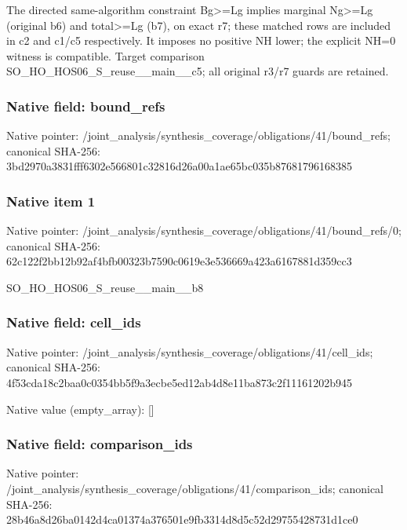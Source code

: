 \documentclass[10pt,a4paper]{article}
\begin{document}
\begingroup\raggedright\sloppy The directed same-algorithm constraint Bg>=\allowbreak{}Lg implies marginal Ng>=\allowbreak{}Lg (original b6) and total>=\allowbreak{}Lg (b7),\allowbreak{} on exact r7;\allowbreak{} these matched rows are included in c2 and c1/\allowbreak{}c5 respectively. It imposes no positive NH lower;\allowbreak{} the explicit NH=\allowbreak{}0 witness is compatible. Target comparison SO\_\allowbreak{}HO\_\allowbreak{}HOS06\_\allowbreak{}S\_\allowbreak{}reuse\_\allowbreak{}\_\allowbreak{}main\_\allowbreak{}\_\allowbreak{}c5;\allowbreak{} all original r3/\allowbreak{}r7 guards are retained.\par\endgroup

\subsubsection{Native field: bound\_\allowbreak{}refs}
Native pointer: /joint\_\allowbreak{}analysis/synthesis\_\allowbreak{}coverage/obligations/41/bound\_\allowbreak{}refs; canonical SHA-256: 3bd2970a3831fff6302e566801c32816d26a00a1ae65bc035b87681796168385

\subsubsection{Native item 1}
Native pointer: /joint\_\allowbreak{}analysis/synthesis\_\allowbreak{}coverage/obligations/41/bound\_\allowbreak{}refs/0; canonical SHA-256: 62c122f2bb12b92af4bfb00323b7590c0619e3e536669a423a6167881d359cc3

\begingroup\raggedright\sloppy SO\_\allowbreak{}HO\_\allowbreak{}HOS06\_\allowbreak{}S\_\allowbreak{}reuse\_\allowbreak{}\_\allowbreak{}main\_\allowbreak{}\_\allowbreak{}b8\par\endgroup

\subsubsection{Native field: cell\_\allowbreak{}ids}
Native pointer: /joint\_\allowbreak{}analysis/synthesis\_\allowbreak{}coverage/obligations/41/cell\_\allowbreak{}ids; canonical SHA-256: 4f53cda18c2baa0c0354bb5f9a3ecbe5ed12ab4d8e11ba873c2f11161202b945

Native value (empty\_\allowbreak{}array): []

\subsubsection{Native field: comparison\_\allowbreak{}ids}
Native pointer: /joint\_\allowbreak{}analysis/synthesis\_\allowbreak{}coverage/obligations/41/comparison\_\allowbreak{}ids; canonical SHA-256: 28b46a8d26ba0142d4ca01374a376501e9fb3314d8d5c52d29755428731d1ce0
\end{document}

